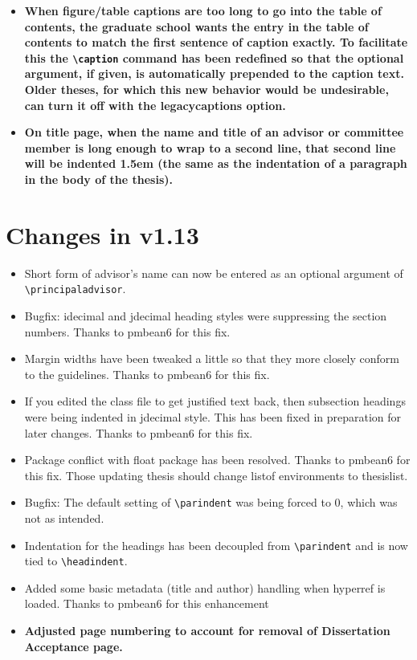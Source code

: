 \begin{itemize}
\item{\bfseries When figure/table captions are too long to go into the table of contents, the graduate school wants the entry in the table of contents to match the first sentence of caption exactly.  To facilitate this the \verb=\caption= command has been redefined so that the optional argument, if given, is automatically prepended to the caption text.  Older theses, for which this new behavior would be undesirable, can turn it off with the legacycaptions option.}
\item{\bfseries On title page, when the name and title of an advisor or committee member is long enough to wrap to a second line, that second line will be indented 1.5em (the same as the indentation of a paragraph in the body of the thesis).}
\end{itemize}

\section{Changes in v1.13}
\begin{itemize}
\item{Short form of advisor's name can now be entered as an optional argument of \verb=\principaladvisor=.}
\item{Bugfix: idecimal and jdecimal heading styles were suppressing the section numbers.  Thanks to pmbean6 for this fix.}
\item{Margin widths have been tweaked a little so that they more closely conform to the guidelines.  Thanks to pmbean6 for this fix.}
\item{If you edited the class file to get justified text back, then subsection headings were being indented in jdecimal style.  This has been fixed in preparation for later changes.  Thanks to pmbean6 for this fix.}
\item{Package conflict with float package has been resolved.  Thanks to pmbean6 for this fix.  Those updating thesis should change listof environments to thesislist.}
\item{Bugfix: The default setting of \verb=\parindent= was being forced to 0, which was not as intended.}
\item{Indentation for the headings has been decoupled from \verb=\parindent= and is now tied to \verb=\headindent=.}
\item{Added some basic metadata (title and author) handling when hyperref is loaded.  Thanks to pmbean6 for this enhancement}
\item{\bfseries Adjusted page numbering to account for removal of Dissertation Acceptance page.}
\end{itemize}

